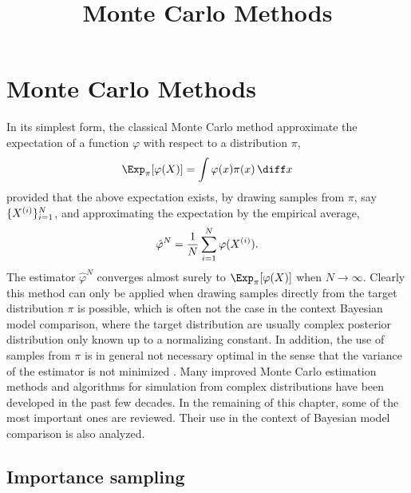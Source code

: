\ifx\inthesis\undefined %

\title{Monte Carlo Methods}

\maketitle
\else %
\chapter{Monte Carlo Methods}
\label{cha:Monte Carlo Methods}
\fi %

In its simplest form, the classical Monte Carlo method approximate the
expectation of a function $\varphi$ with respect to a distribution $\pi$,
\begin{equation}
  \Exp_{\pi}[\varphi(X)] = \int\varphi(x)\pi(x)\intd x
\end{equation}
provided that the above expectation exists, by drawing \iid samples from
$\pi$, say $\{X^{(i)}\}_{i=1}^N$, and approximating the expectation by the
empirical average,
\begin{equation}
  \hat\varphi^N = \frac{1}{N}\sum_{i=1}^N\varphi(X^{(i)}).
  \label{eq:vanilla mc}
\end{equation}
The estimator $\hat\varphi^N$ converges almost surely to
$\Exp_{\pi}[\varphi(X)]$ when $N\to\infty$. Clearly this method can only be
applied when drawing samples directly from the target distribution $\pi$ is
possible, which is often not the case in the context Bayesian model
comparison, where the target distribution are usually complex posterior
distribution only known up to a normalizing constant. In addition, the use of
samples from $\pi$ is in general not necessary optimal in the sense that the
variance of the estimator is not minimized \cite[][sec.~3.3.2]{Robert:2004tn}.
Many improved Monte Carlo estimation methods and algorithms for simulation
from complex distributions have been developed in the past few decades. In the
remaining of this chapter, some of the most important ones are reviewed. Their
use in the context of Bayesian model comparison is also analyzed.

\section{Importance sampling}
\label{sec:Importance sampling}

